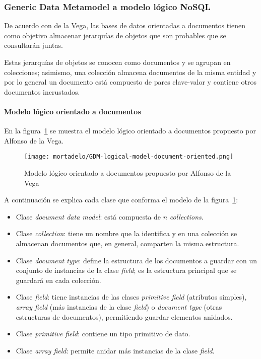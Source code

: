 \subsubsection{Generic Data Metamodel a modelo lógico NoSQL}\label{alg:gdm-to-logic}
De acuerdo con de la Vega\cite{de_la_vega_mortadelo_2020}, las bases de datos orientadas a documentos tienen como objetivo almacenar jerarquías de objetos que son probables que se consultarán juntas.


Estas jerarquías de objetos se conocen como documentos y se agrupan en colecciones; asimismo, una colección almacena documentos de la misma entidad y por lo general un documento está compuesto de pares clave-valor y contiene otros documentos incrustados.


\paragraph*{Modelo lógico orientado a documentos}

En la figura~\ref{img:mortadelo-gdm-logical-model-document-oriented} se muestra el modelo lógico orientado a documentos propuesto por Alfonso de la Vega.


\begin{figure}[H] 
    \centering
    \texttt{[image: mortadelo/GDM-logical-model-document-oriented.png]}
    \caption{Modelo lógico orientado a documentos propuesto por Alfonso de la Vega}
    \label{img:mortadelo-gdm-logical-model-document-oriented}
\end{figure}

A continuación se explica cada clase que conforma el modelo de la figura~\ref{img:mortadelo-gdm-logical-model-document-oriented}:

\begin{itemize}
    \item Clase \textit{document data model}: está compuesta de $n$ \textit{collections}.
    \item Clase \textit{collection}: tiene un nombre que la identifica y en una colección se almacenan documentos que, en general, comparten la misma estructura.
    \item Clase \textit{document type}: define la estructura de los documentos a guardar con un conjunto de instancias de la clase \textit{field}; es la estructura principal que se guardará en cada colección.
    \item Clase \textit{field}: tiene instancias de las clases \textit{primitive field} (atributos simples), \textit{array field} (más instancias de la clase \textit{field}) o \textit{document type} (otras estructuras de documentos), permitiendo guardar elementos anidados.
    \item Clase \textit{primitive field}: contiene un tipo primitivo de dato.
    \item Clase \textit{array field}: permite anidar más instancias de la clase \textit{field}.
\end{itemize}


